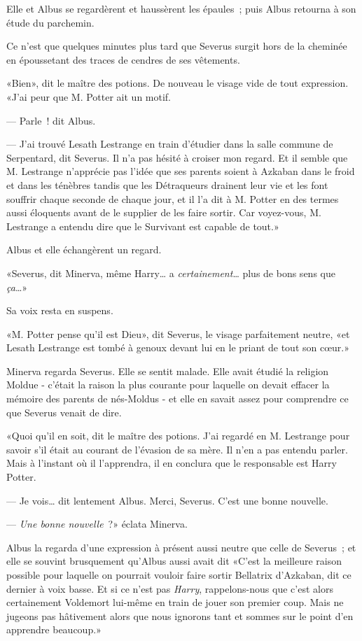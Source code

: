 Elle et Albus se regardèrent et haussèrent les épaules~; puis Albus retourna à son étude du parchemin.

Ce n'est que quelques minutes plus tard que Severus surgit hors de la cheminée en époussetant des traces de cendres de ses vêtements.

«Bien», dit le maître des potions. De nouveau le visage vide de tout expression. «J'ai peur que M. Potter ait un motif.

--- Parle~! dit Albus.

--- J'ai trouvé Lesath Lestrange en train d'étudier dans la salle commune de Serpentard, dit Severus. Il n'a pas hésité à croiser mon regard. Et il semble que M. Lestrange n'apprécie pas l'idée que ses parents soient à Azkaban dans le froid et dans les ténèbres tandis que les Détraqueurs drainent leur vie et les font souffrir chaque seconde de chaque jour, et il l'a dit à M. Potter en des termes aussi éloquents avant de le supplier de les faire sortir. Car voyez-vous, M. Lestrange a entendu dire que le Survivant est capable de tout.»

Albus et elle échangèrent un regard.

«Severus, dit Minerva, même Harry… a \emph{certainement}… plus de bons sens que \emph{ça}…»

Sa voix resta en suspens.

«M. Potter pense qu'il est Dieu», dit Severus, le visage parfaitement neutre, «et Lesath Lestrange est tombé à genoux devant lui en le priant de tout son cœur.»

Minerva regarda Severus. Elle se sentit malade. Elle avait étudié la religion Moldue - c'était la raison la plus courante pour laquelle on devait effacer la mémoire des parents de nés-Moldus - et elle en savait assez pour comprendre ce que Severus venait de dire.

«Quoi qu'il en soit, dit le maître des potions. J'ai regardé en M. Lestrange pour savoir s'il était au courant de l'évasion de sa mère. Il n'en a pas entendu parler. Mais à l'instant où il l'apprendra, il en conclura que le responsable est Harry Potter.

--- Je vois… dit lentement Albus. Merci, Severus. C'est une bonne nouvelle.

--- \emph{Une bonne nouvelle}~?» éclata Minerva.

Albus la regarda d'une expression à présent aussi neutre que celle de Severus~; et elle se souvint brusquement qu'Albus aussi avait dit «C'est la meilleure raison possible pour laquelle on pourrait vouloir faire sortir Bellatrix d'Azkaban, dit ce dernier à voix basse. Et si ce n'est pas \emph{Harry}, rappelons-nous que c'est alors certainement Voldemort lui-même en train de jouer son premier coup. Mais ne jugeons pas hâtivement alors que nous ignorons tant et sommes sur le point d'en apprendre beaucoup.»


